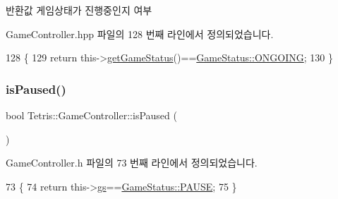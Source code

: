 \begin{DoxyReturn}{반환값}
게임상태가 진행중인지 여부 
\end{DoxyReturn}


Game\+Controller.\+hpp 파일의 128 번째 라인에서 정의되었습니다.


\begin{DoxyCode}
128                             \{
129                 \textcolor{keywordflow}{return} this->\hyperlink{class_tetris_1_1_game_controller_a3b95b1b7a3a18c27402100f70c1ac1ab}{getGameStatus}()==\hyperlink{class_tetris_1_1_game_controller_a96a963b56385f3b3a122ff0ca2beb770acff9d04a8a29792d319be9177afb8ba3}{GameStatus::ONGOING};
130             \}
\end{DoxyCode}
\mbox{\label{class_tetris_1_1_game_controller_a18e513f45750361e14af091704e9f1d4}} 
\subsubsection{\texorpdfstring{is\+Paused()}{isPaused()}\hspace{0.1cm}{\footnotesize\ttfamily [1/2]}}
{\footnotesize\ttfamily bool Tetris\+::\+Game\+Controller\+::is\+Paused (\begin{DoxyParamCaption}{ }\end{DoxyParamCaption})\hspace{0.3cm}{\ttfamily [inline]}}



Game\+Controller.\+h 파일의 73 번째 라인에서 정의되었습니다.


\begin{DoxyCode}
73                        \{
74             \textcolor{keywordflow}{return} this->\hyperlink{class_tetris_1_1_game_controller_ae4c894005a82404c73a5a9a6efb208dc}{gs}==\hyperlink{class_tetris_1_1_game_controller_a96a963b56385f3b3a122ff0ca2beb770a291554596c183e837f0a6bec3767c891}{GameStatus::PAUSE};
75         \}
\end{DoxyCode}
\mbox{\label{class_tetris_1_1_game_controller_a18e513f45750361e14af091704e9f1d4}} 
